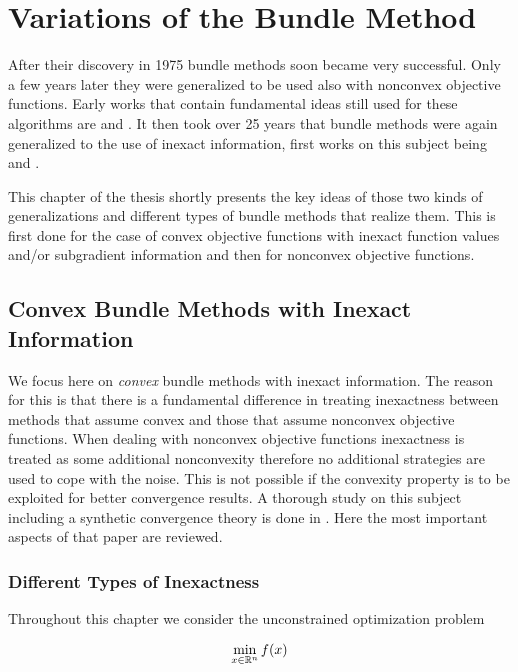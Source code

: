 \section{Variations of the Bundle Method}
\label{sec_simplifications}

After their discovery in 1975 bundle methods soon became very successful. Only a few years later they were generalized to be used also with nonconvex objective functions. Early works that contain fundamental ideas still used for these algorithms are \cite{Mifflin1982} and \cite{Kiwiel1985}.
It then took over 25 years that bundle methods were again generalized to the use of inexact information, first works on this subject being \cite{Hintermueller2001,Kiwiel2006} and \cite{Solodov2003}.

This chapter of the thesis shortly presents the key ideas of those two kinds of generalizations and different types of bundle methods that realize them.
This is first done for the case of convex objective functions with inexact function values and/or subgradient information and then for nonconvex objective functions. 

\subsection{Convex Bundle Methods with Inexact Information}

We focus here on \emph{convex} bundle methods with inexact information. The reason for this is that there is a fundamental difference in treating inexactness between methods that assume convex and those that assume nonconvex objective functions.
When dealing with nonconvex objective functions inexactness is treated as some additional nonconvexity therefore no additional strategies are used to cope with the noise. This is not possible if the convexity property is to be exploited for better convergence results.
A thorough study on this subject including a synthetic convergence theory is done in \cite{Oliveira2014}. Here the most important aspects %
of that paper are reviewed.

\subsubsection{Different Types of Inexactness}

Throughout this chapter we consider the unconstrained optimization problem

\begin{equation}
	\min_{x \in \mathbb{R}^n} f(x)
\label{opt_prob_conv}
\end{equation}

